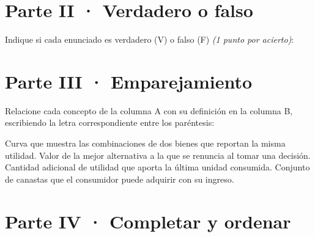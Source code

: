 \documentclass{evaluacion}
\begin{document}
\section*{\color{colorprimario}Parte II · Verdadero o falso}

\begin{pregunta}[4]
Indique si cada enunciado es verdadero (V) o falso (F)
\emph{(1 punto por acierto)}:
\begin{tablavf}
\end{tablavf}
\end{pregunta}

\section*{\color{colorprimario}Parte III · Emparejamiento}

\begin{pregunta}[4]
Relacione cada concepto de la columna A con su definición en la columna B,
escribiendo la letra correspondiente entre los paréntesis:
\begin{emparejamiento}
    {Curva que muestra las combinaciones de dos bienes que reportan la
     misma utilidad.}
    {Valor de la mejor alternativa a la que se renuncia al tomar una
     decisión.}
    {Cantidad adicional de utilidad que aporta la última unidad consumida.}
    {Conjunto de canastas que el consumidor puede adquirir con su ingreso.}
\end{emparejamiento}
\end{pregunta}

\section*{\color{colorprimario}Parte IV · Completar y ordenar}
\end{document}
